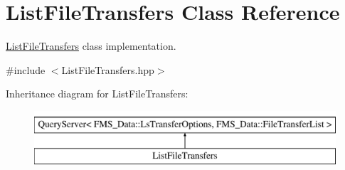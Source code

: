 \hypertarget{classListFileTransfers}{
\section{ListFileTransfers Class Reference}
\label{classListFileTransfers}
}


\hyperlink{classListFileTransfers}{ListFileTransfers} class implementation.  




{\ttfamily \#include $<$ListFileTransfers.hpp$>$}

Inheritance diagram for ListFileTransfers:\begin{figure}[H]
\begin{center}
\leavevmode
\includegraphics[height=2.000000cm]{classListFileTransfers}
\end{center}
\end{figure}
